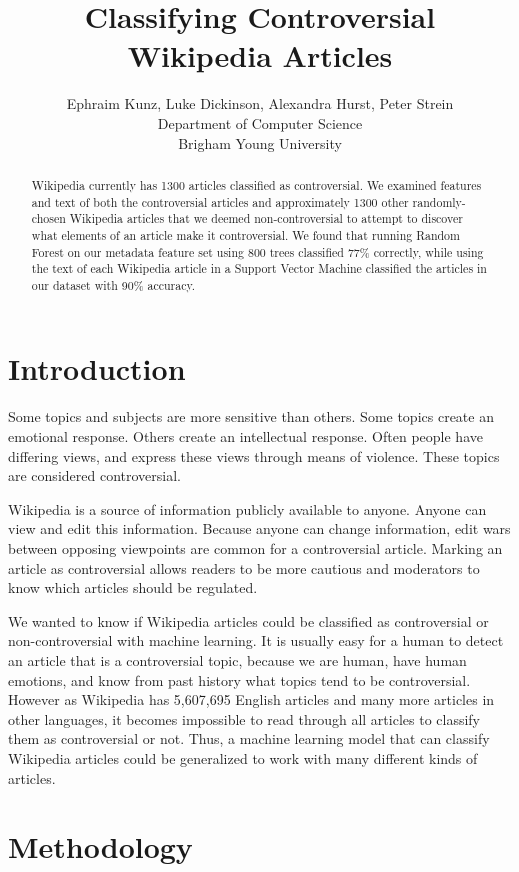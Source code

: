 \documentclass{article}
\title{Classifying Controversial Wikipedia Articles}
\author{Ephraim Kunz, Luke Dickinson, Alexandra Hurst, Peter Strein \\
Department of Computer Science\\
Brigham Young University}
\begin{document}
\maketitle

\begin{abstract}
Wikipedia currently has 1300 articles classified as controversial. We examined features and text of both the controversial articles and approximately 1300 other randomly-chosen Wikipedia articles that we deemed non-controversial to attempt to discover what elements of an article make it controversial. We found that running Random Forest on our metadata feature set using 800 trees classified 77\% correctly, while using the text of each Wikipedia article in a Support Vector Machine classified the articles in our dataset with 90\% accuracy. 
\end{abstract}

\section{Introduction}

Some topics and subjects are more sensitive than others. Some topics create an emotional response. Others create an intellectual response. Often people have differing views, and express these views through means of violence. These topics are considered controversial. 

Wikipedia is a source of information publicly available to anyone. Anyone can view and edit this information. Because anyone can change information, edit wars between opposing viewpoints are common for a controversial article. Marking an article as controversial allows readers to be more cautious and moderators to know which articles should be regulated.

We wanted to know if Wikipedia articles could be classified as controversial or non-controversial with machine learning.  It is usually easy for a human to detect an article that is a controversial topic, because we are human, have human emotions, and know from past history what topics tend to be controversial. However as Wikipedia has 5,607,695 English articles \cite{sizeOfWiki} and many more articles in other languages, it becomes impossible to read through all articles to classify them as controversial or not. Thus, a machine learning model that can classify Wikipedia articles could be generalized to work with many different kinds of articles. 

\section{Methodology}
\end{document}
